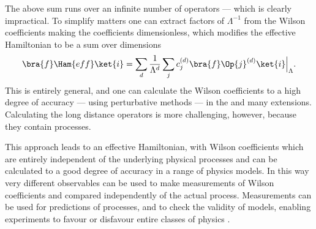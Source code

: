 The above sum runs over an infinite number of operators --- which is clearly impractical.
To simplify matters one can extract factors of $\Lambda^{-1}$ from the Wilson coefficients
making the coefficients dimensionless, which
modifies the effective Hamiltonian to be a sum over dimensions
\begin{equation}
  \bra{f}\Ham{eff}\ket{i} =
  \sum_{d}\frac{1}{\Lambda^{d}}
  \sum_j c_j^{(d)}\bra{f}\Op{j}^{(d)}\ket{i}\Big|_{\Lambda}.
  \label{eq:th:opehamnorm}
\end{equation}
This is entirely general, and one can calculate the Wilson coefficients to a high degree of
accuracy --- using perturbative methods --- in the \sm and many \bsm extensions.
Calculating the long distance operators is more challenging, however, because they contain \QCD
processes.

This approach leads to an effective Hamiltonian, with Wilson coefficients which are entirely
independent of the underlying physical processes and can be calculated to a good degree of accuracy
in a range of physics models.
In this way very different observables can be used to make measurements of Wilson coefficients and
compared independently of the actual process.
Measurements can be used for predictions of processes, and to check the validity of \np models,
enabling experiments to favour or disfavour entire classes of physics \bsm.

